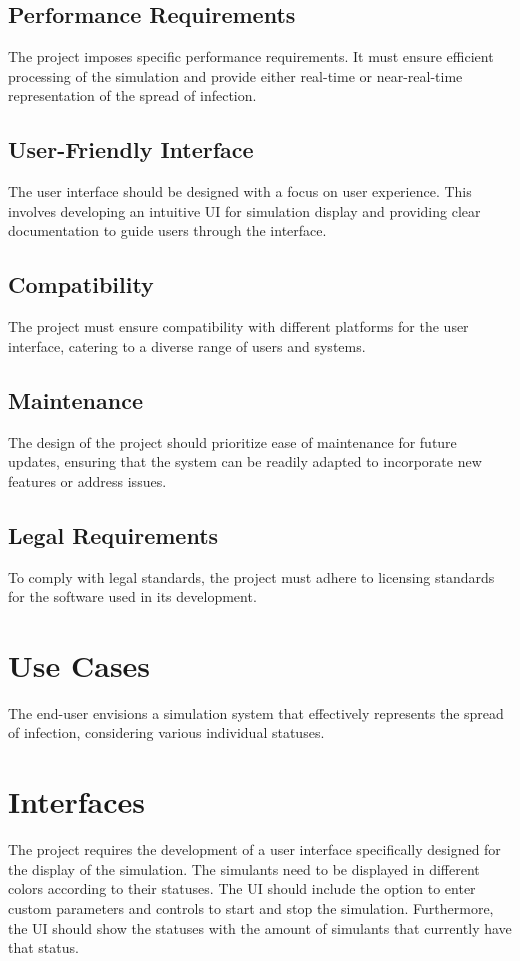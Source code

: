 \documentclass{article}
\begin{document}
	\subsection{Performance Requirements}
	The project imposes specific performance requirements. It must ensure efficient processing of the simulation and provide either real-time or near-real-time representation of the spread of infection.
	
	\subsection{User-Friendly Interface}
	The user interface should be designed with a focus on user experience. This involves developing an intuitive UI for simulation display and providing clear documentation to guide users through the interface.
	
	\subsection{Compatibility}
	The project must ensure compatibility with different platforms for the user interface, catering to a diverse range of users and systems.
	
	\subsection{Maintenance}
	The design of the project should prioritize ease of maintenance for future updates, ensuring that the system can be readily adapted to incorporate new features or address issues.
	
	\subsection{Legal Requirements}
	To comply with legal standards, the project must adhere to licensing standards for the software used in its development.
	
	\section{Use Cases}
	The end-user envisions a simulation system that effectively represents the spread of infection, considering various individual statuses.
	
	\section{Interfaces}
	The project requires the development of a user interface specifically designed for the display of the simulation. The simulants need to be displayed in different colors according to their statuses. The UI should include the option to enter custom parameters and controls to start and stop the simulation. Furthermore, the UI should show the statuses with the amount of simulants that currently have that status.
	
\end{document}
